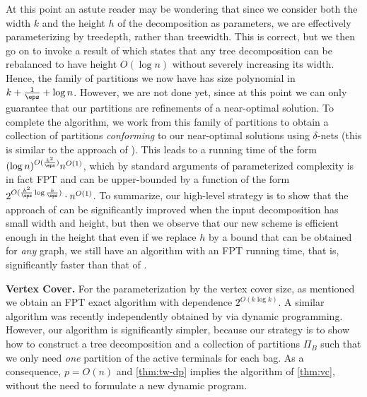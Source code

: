 At this point an astute reader may be wondering that since we consider both the
width $k$ and the height $h$ of the decomposition as parameters, we are
effectively parameterizing by treedepth, rather than treewidth. This is
correct, but we then go on to invoke a result of \citet{BodlaenderH98} which
states that any tree decomposition can be rebalanced to have height $O(\log n)$
without severely increasing its width. Hence, the family of partitions we now
have has size polynomial in $k+\frac{1}{\eps}+\log n$. 
However, we are not done yet, since at this point we can
only guarantee that our partitions are refinements of a near-optimal
solution. To complete the algorithm, we work from this family of partitions to
obtain a collection of partitions \emph{conforming} to our near-optimal
solutions using $\delta$-nets (this is similar to the approach of
\cite{bateni2011approximation}). This leads to a running time of the form
$(\log n)^{O(\frac{k^2}{\eps})}n^{O(1)}$, which by standard arguments of parameterized
complexity is in fact FPT and can be upper-bounded by a function of the form
$2^{O(\frac{k^2}{\eps}\log\frac{k}{\eps})}\cdot n^{O(1)}$. 
To summarize, our high-level strategy is to
show that the approach of \cite{bateni2011approximation} can be significantly
improved when the input decomposition has small width and height, but then we
observe that our new scheme is efficient enough in the height that even if we
replace $h$ by a bound that can be obtained for \emph{any} graph, we still have
an algorithm with an FPT running time, that is, significantly faster than that
of \cite{bateni2011approximation}. 

\smallskip
\textbf{Vertex Cover.} For the parameterization by the vertex cover size, as
mentioned we obtain an FPT exact algorithm with dependence $2^{O(k\log k)}$. A
similar algorithm was recently independently obtained by
\citet{bodlaender2023complexity} via dynamic programming. However, our
algorithm is significantly simpler, because our strategy is to show how to
construct a tree decomposition and a collection of partitions $\Pi_B$ such that
we only need \emph{one} partition of the active terminals for each bag. As a
consequence, $p=O(n)$ and \autoref{thm:tw-dp} implies the algorithm of
\autoref{thm:vc}, without the need to formulate a new dynamic program.

